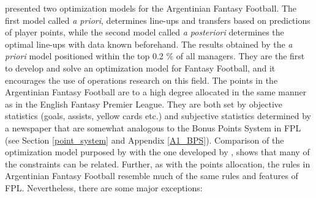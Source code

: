 \newpar

\cite{Bonomo} presented two optimization models for the Argentinian Fantasy Football. The first model called \textit{a priori}, determines line-ups and transfers based on predictions of player points, while the second model called \textit{a posteriori} determines the optimal line-ups with data known beforehand. The results obtained by the \textit{a priori} model positioned within the top 0.2 \% of all managers. They are the first to develop and solve an optimization model for Fantasy Football, and it encourages the use of operations research on this field. The points in the Argentinian Fantasy Football are to a high degree allocated in the same manner as in the English Fantasy Premier League. They are both set by objective statistics (goals, assists, yellow cards etc.) and subjective statistics determined by a newspaper that are somewhat analogous to the Bonus Points System in FPL (see Section \ref{point_system} and Appendix \ref{A1_BPS}). Comparison of the optimization model purposed by \cite{Bonomo} with the one developed by \cite{Mathsports}, shows that many of the constraints can be related. Further, as with the points allocation, the rules in Argentinian Fantasy Football resemble much of the same rules and features of FPL. Nevertheless, there are some major exceptions: 



